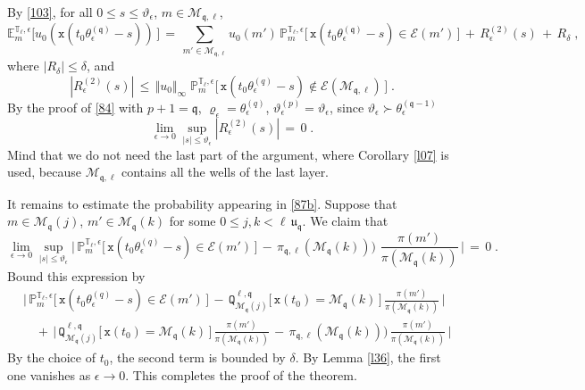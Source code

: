 \documentclass[reqno]{amsart}
\theoremstyle{plain}
\theoremstyle{definition}
\newcommand{\mf}[1]{{\mathfrak #1}}
\newcommand{\bb}[1]{{\mathbb #1}}
\newcommand{\ms}[1]{{\mathscr #1}}
\newcommand{\mtt}[1]{{\mathtt #1}}
\newcounter{as}[section]
\newcommand{\<}{\langle}
\renewcommand{\>}{\rangle}
\begin{document}
By \eqref{103}, for all $0\le s \le \vartheta_\epsilon$,
$m\in \ms M_{\mf q, \ell}$,
\begin{equation}
\label{87b}
\bb E^{\bb T_\ell, \epsilon}_{m} \big[ u_0( \mtt x(t_0\theta^{(\mf
q)}_\epsilon - s))
\,\big] 
\,=\, \sum_{m'\in \ms M_{\mf q, \ell}} u_0(m')\, 
\bb P^{\bb T_\ell, \epsilon}_m\big[ \, 
\mtt x(t_0\theta^{(\mf q)}_\epsilon - s) \in \ms E(m') \, \big]
\,+\, R^{(2)}_\epsilon (s)\,+\, R_\delta \;,
\end{equation}
where $|R_\delta|\le \delta$, and
\begin{equation*}
|R^{(2)}_\epsilon (s)| \,\le\, \Vert u_0\Vert_\infty\;
\bb P^{\bb T_\ell, \epsilon}_m\Big[ \, 
\mtt x(t_0 \theta^{(q)}_\epsilon - s) \not\in
\ms E(\ms M_{\mf q, \ell}) \,\Big] \;.
\end{equation*}
By the proof of \eqref{84} with $p+1=\mf q$, $\varrho_\epsilon =
\theta^{(q)}_\epsilon$, $\vartheta^{(p)}_\epsilon = \vartheta_\epsilon$,
since $\vartheta_\epsilon \succ \theta^{(\mf q-1)}_\epsilon$
\begin{equation}
\label{84b}
\lim_{\epsilon\to 0} \sup_{|s| \le \vartheta_\epsilon}
|R^{(2)}_\epsilon (s)| \,=\, 0\;.
\end{equation}
Mind that we do not need the last part of the argument, where
Corollary \ref{l07} is used, because $\ms M_{\mf q, \ell}$
contains all the wells of the last layer.

It remains to estimate the probability appearing in \eqref{87b}.
Suppose that $m\in \ms M_{\mf q}(j)$, $m'\in \ms M_{\mf q}(k)$ for
some $0\le j, k < \ell \, \mf u_{\mf q}$.  We claim that
\begin{equation*}
\lim_{\epsilon\to 0} 
\sup_{|s|\le \vartheta_\epsilon}
\Big|\, \bb P_m^{\bb T_\ell,\epsilon } \big[\, \mtt x
(t_0 \theta^{(q)}_\epsilon  - s) \in \ms E(m') \,\big]
\,-\, \pi_{\mf q, \ell} (\ms M_{\mf q}(k)))\, \,
\frac{\pi(m')}{\pi(\ms M_{\mf q}(k))} \,\Big| \,=\, 0\;.
\end{equation*}
Bound this expression by
\begin{equation*}
\begin{aligned}
& 
\Big|\, \bb P_m^{\bb T_\ell,\epsilon } \big[\, \mtt x
(t_0 \theta^{(q)}_\epsilon  - s) \in \ms E(m')\,\big]
\,-\, \mtt Q^{\ell, \mf q}_{\ms M_{\mf q} (j)}
\big[\, \mtt x(t_0) = \ms M_{\mf q} (k)\,]
\, \frac{\pi(m')}{\pi(\ms M_{\mf q}(k))} \,\Big|
\\
&\quad +\,
\Big|\, \mtt Q^{\ell, \mf q}_{\ms M_{\mf q} (j)}
\big[\, \mtt x(t_0) = \ms M_{\mf q} (k)\,]
\, \frac{\pi(m')}{\pi(\ms M_{\mf q}(k))} \,-\,
\pi_{\mf q, \ell} (\ms M_{\mf q}(k)))\, 
\frac{\pi(m')}{\pi(\ms M_{\mf q}(k))} \,\Big|
\end{aligned}
\end{equation*}
By the choice of $t_0$, the second term is bounded by $\delta$.
By Lemma \ref{l36}, the first one vanishes as $\epsilon\to 0$. This
completes the proof of the theorem.
\end{document}
